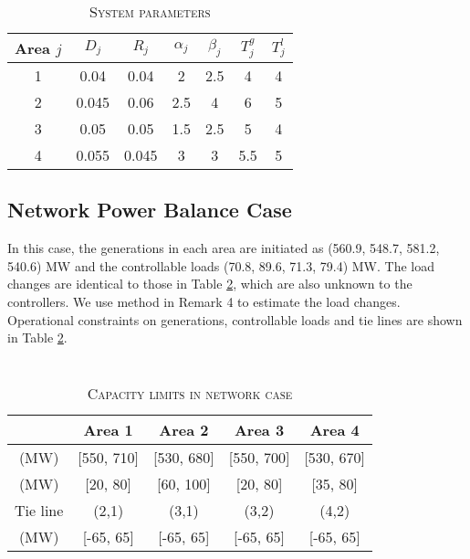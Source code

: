 \begin{table}[http]
        \centering
        \caption{\\ \textsc{System parameters}}
        \label{tab:SysPara}
        \begin{tabular}{c c c c c c c}
                \hline 
                Area $j$ & $D_j$ & $R_j$ & $\alpha_j$ & $\beta_j$ &$T^g_j$ &$T^l_j$\\
                \hline
                1 & 0.04  & 0.04  & 2    & 2.5  & 4    & 4 \\
                2 & 0.045  & 0.06  & 2.5  & 4    & 6    & 5 \\
                3 & 0.05  & 0.05  & 1.5  & 2.5  & 5    & 4 \\
                4 & 0.055  & 0.045 & 3    & 3    & 5.5  & 5 \\
                \hline
        \end{tabular}
\end{table}



\subsection {Network Power Balance Case}

In this case, the generations in each area are initiated as (560.9, 548.7, 581.2, 540.6) MW and the controllable loads (70.8, 89.6, 71.3, 79.4) MW. The load changes are identical to those in Table \ref{tab:DistConstraintsnet}, which are also unknown to the controllers. We  use method in Remark 4 to estimate the load changes. Operational constraints on generations, controllable loads and tie lines are shown in Table \ref{tab:DistConstraintsnet}. 

\begin{table}[htb]
	\centering
	\caption{\\ \textsc {Capacity limits in network case}}
	\label{tab:DistConstraintsnet}
	\begin{tabular}{c c c c c}
		\hline 
		& Area 1 & Area 2 & Area 3& Area 4\\
		\hline
		[$\underline{P}^g_j$,$\overline{P}^g_j$] (MW) & [550, 710] & [530, 680] & [550, 700]& [530, 670]\\
		\hline
		[$\underline{P}^l_j$,$\overline{P}^l_j$] (MW) & [20, 80] & [60, 100] & [20, 80] & [35, 80]\\
		\hline
		\hline
		Tie line & (2,1) & (3,1) & (3,2) & (4,2)\\
		\hline
		[$\underline P_{ij}$,$\overline P_{ij}$] (MW) & [-65, 65] & [-65, 65] & [-65, 65] & [-65, 65]\\
		\hline
	\end{tabular}
\end{table}

